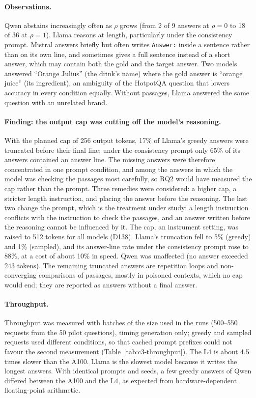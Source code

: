 \documentclass[11pt,a4paper]{report}
\begin{document}
\paragraph{Observations.}
Qwen abstains increasingly often as $\rho$ grows (from 2 of 9 answers at
$\rho = 0$ to 18 of 36 at $\rho = 1$). Llama reasons at length, particularly
under the consistency prompt. Mistral answers briefly but often writes
\texttt{Answer:} inside a sentence rather than on its own line, and sometimes
gives a full sentence instead of a short answer, which may contain both the
gold and the target answer. Two models answered ``Orange Julius'' (the drink's
name) where the gold answer is ``orange juice'' (its ingredient), an ambiguity
of the HotpotQA question that lowers accuracy in every condition equally.
Without passages, Llama answered the same question with an unrelated brand.

\paragraph{Finding: the output cap was cutting off the model's reasoning.}
With the planned cap of 256 output tokens, 17\% of Llama's greedy answers were
truncated before their final line; under the consistency prompt only 65\% of
its answers contained an answer line. The missing answers were therefore
concentrated in one prompt condition, and among the answers in which the
model was checking the passages most carefully, so RQ2 would have measured the
cap rather than the prompt. Three remedies were considered: a higher cap, a
stricter length instruction, and placing the answer before the reasoning. The
last two change the prompt, which is the treatment under study: a length
instruction conflicts with the instruction to check the passages, and an
answer written before the reasoning cannot be influenced by it. The cap, an
instrument setting, was raised to 512 tokens for all models (D138). Llama's
truncation fell to 5\% (greedy) and 1\% (sampled), and its answer-line rate
under the consistency prompt rose to 88\%, at a cost of about 10\% in speed.
Qwen was unaffected (no answer exceeded 243 tokens). The remaining truncated
answers are repetition loops and non-converging comparisons of passages,
mostly in poisoned contexts, which no cap would end; they are reported as
answers without a final answer.

\paragraph{Throughput.}
Throughput was measured with batches of the size used in the runs (500--550
requests from the 50 pilot questions), timing generation only; greedy and
sampled requests used different conditions, so that cached prompt prefixes
could not favour the second measurement (Table~\ref{tab:c3-throughput}). The
L4 is about 4.5 times slower than the A100. Llama is the slowest model because
it writes the longest answers. With identical prompts and seeds, a few greedy
answers of Qwen differed between the A100 and the L4, as expected from
hardware-dependent floating-point arithmetic.
\end{document}

